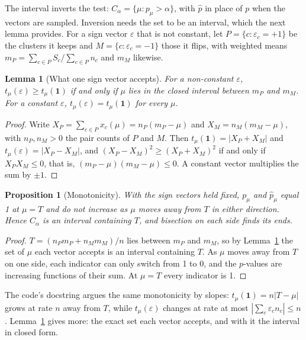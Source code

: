 \documentclass[11pt]{article}
\theoremstyle{plain}
\newtheorem{lemma}[theorem]{Lemma}
\newtheorem{proposition}[theorem]{Proposition}
\theoremstyle{definition}
\theoremstyle{remark}
\newcommand{\sgn}{\varepsilon}
\newcommand{\one}{\mathbf{1}}
\begin{document}
The interval inverts the test: $C_\alpha = \{\mu : p_\mu > \alpha\}$, with $\hat p$ in place of $p$
when the vectors are sampled. Inversion needs the set to be an interval, which the next lemma
provides. For a sign vector $\sgn$ that is not constant, let $P = \{c : \sgn_c = +1\}$ be the
clusters it keeps and $M = \{c : \sgn_c = -1\}$ those it flips, with weighted means
$m_P = \sum_{c \in P} S_c / \sum_{c \in P} n_c$ and $m_M$ likewise.

\begin{lemma}[What one sign vector accepts]\label{lem:accept}
For a non-constant $\sgn$, $t_\mu(\sgn) \ge t_\mu(\one)$ if and only if $\mu$ lies in the closed
interval between $m_P$ and $m_M$. For a constant $\sgn$, $t_\mu(\sgn) = t_\mu(\one)$ for every
$\mu$.
\end{lemma}
\begin{proof}
Write $X_P = \sum_{c \in P} x_c(\mu) = n_P (m_P - \mu)$ and $X_M = n_M (m_M - \mu)$, with $n_P,
n_M > 0$ the pair counts of $P$ and $M$. Then $t_\mu(\one) = |X_P + X_M|$ and $t_\mu(\sgn) = |X_P
- X_M|$, and $(X_P - X_M)^2 \ge (X_P + X_M)^2$ if and only if $X_P X_M \le 0$, that is,
$(m_P - \mu)(m_M - \mu) \le 0$. A constant vector multiplies the sum by $\pm 1$.
\end{proof}

\begin{proposition}[Monotonicity]\label{prop:mono}
With the sign vectors held fixed, $p_\mu$ and $\hat p_\mu$ equal 1 at $\mu = T$ and do not
increase as $\mu$ moves away from $T$ in either direction. Hence $C_\alpha$ is an interval
containing $T$, and bisection on each side finds its ends.
\end{proposition}
\begin{proof}
$T = (n_P m_P + n_M m_M)/n$ lies between $m_P$ and $m_M$, so by Lemma~\ref{lem:accept} the set of $\mu$
each vector accepts is an interval containing $T$. As $\mu$ moves away from $T$ on one side, each
indicator can only switch from 1 to 0, and the $p$-values are increasing functions of their sum.
At $\mu = T$ every indicator is 1.
\end{proof}

The code's docstring argues the same monotonicity by slopes: $t_\mu(\one) = n|T - \mu|$ grows at
rate $n$ away from $T$, while $t_\mu(\sgn)$ changes at rate at most $|\sum_c \sgn_c n_c| \le n$.
Lemma~\ref{lem:accept} gives more: the exact set each vector accepts, and with it the interval in closed
form.
\end{document}
